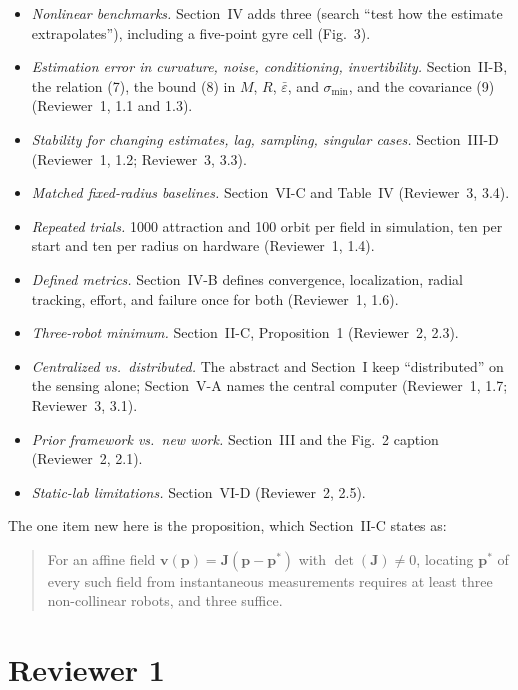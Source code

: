 \documentclass[10pt]{article}
\newcommand{\rev}[1]{#1}                             %
\newenvironment{newtext}{\begin{quote}\small\sloppy}{\end{quote}}
\begin{document}
\begin{itemize}
\item[(b)] \emph{Nonlinear benchmarks.} Section~IV adds three (search ``test how the estimate extrapolates''), including a five-point gyre cell (Fig.~3).
\item[(c)] \emph{Estimation error in curvature, noise, conditioning, invertibility.} Section~II-B, the relation (7), the bound (8) in $M$, $R$, $\bar\varepsilon$, and $\sigma_{\min}$, and the covariance (9) (Reviewer~1, 1.1 and 1.3).
\item[(d)] \emph{Stability for changing estimates, lag, sampling, singular cases.} Section~III-D (Reviewer~1, 1.2; Reviewer~3, 3.3).
\item[(e)] \emph{Matched fixed-radius baselines.} Section~VI-C and Table~IV (Reviewer~3, 3.4).
\item[(f)] \emph{Repeated trials.} 1000 attraction and \rev{100} orbit per field in simulation, ten per start and \rev{ten} per radius on hardware (Reviewer~1, 1.4).
\item[(g)] \emph{Defined metrics.} Section~IV-B defines convergence, localization, radial tracking, effort, and failure once for both (Reviewer~1, 1.6).
\item[(h)] \emph{Three-robot minimum.} Section~II-C, Proposition~1 (Reviewer~2, 2.3).
\item[(i)] \emph{Centralized vs.\ distributed.} The abstract and Section~I keep ``distributed'' on the sensing alone; Section~V-A names the central computer (Reviewer~1, 1.7; Reviewer~3, 3.1).
\item[(j)] \emph{Prior framework vs.\ new work.} Section~III and the Fig.~2 caption (Reviewer~2, 2.1).
\item[(k)] \emph{Static-lab limitations.} Section~VI-D (Reviewer~2, 2.5).
\end{itemize}

The one item new here is the proposition, which Section~II-C states as:
\begin{newtext}
For an affine field $\mathbf{v}(\mathbf{p}) = \mathbf{J}(\mathbf{p}-\mathbf{p}^*)$ with $\det(\mathbf{J}) \neq 0$, locating $\mathbf{p}^*$ of every such field from instantaneous measurements requires at least three non-collinear robots, and three suffice.
\end{newtext}

\newpage
\section*{Reviewer 1}
\end{document}

